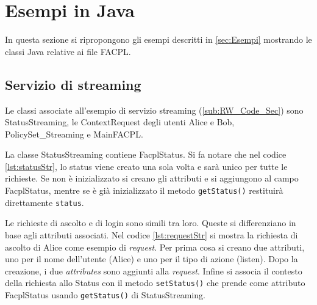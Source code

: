 \section{Esempi in Java}
\label{sec:Esempi in Java}
In questa sezione si ripropongono gli esempi descritti in \ref{sec:Esempi} mostrando le classi Java relative
ai file FACPL.
\subsection{Servizio di streaming}
\label{sub:EsStreamingJava}
Le classi associate all'esempio di servizio streaming (\ref{sub:RW_Code_Sec})
sono StatusStreaming, le ContextRequest degli utenti Alice e Bob, PolicySet\_Streaming e MainFACPL.

La classe StatusStreaming contiene FacplStatus. Si fa notare che nel codice \ref{lst:statusStr},
lo status viene creato una sola volta e sarà unico per tutte le richieste. Se non è inizializzato
si creano gli attributi e si aggiungono al campo FacplStatus, mentre se è già inizializzato il metodo
\texttt{getStatus()} restituirà direttamente \texttt{status}.

Le richieste di ascolto e di login sono simili tra loro. Queste si differenziano in base agli attributi associati.
Nel codice \ref{lst:requestStr} si mostra la richiesta di ascolto di Alice come esempio di \emph{request}.
Per prima cosa si creano due attributi, uno per il nome dell'utente (Alice) e uno per il tipo di azione (listen).
Dopo la creazione, i due \emph{attributes} sono aggiunti alla \emph{request}. Infine si associa il contesto della
richiesta allo Status con il metodo \texttt{setStatus()} che prende come attributo FacplStatus usando \texttt{getStatus()}
di StatusStreaming. \par
{}

